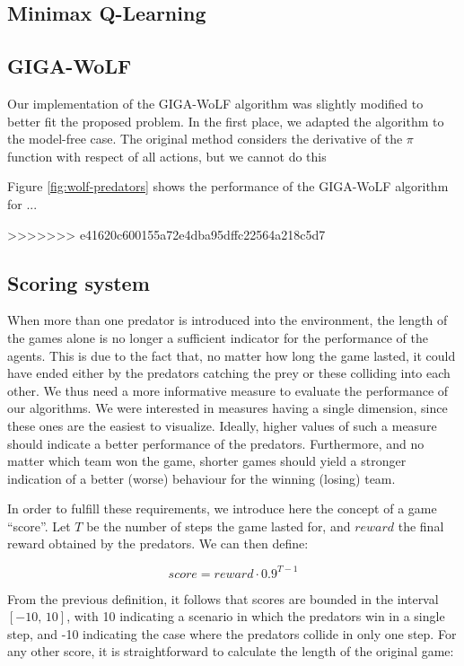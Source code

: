 \documentclass[a4paper,12pt]{article}
\begin{document}
\subsection{Minimax Q-Learning}

\subsection{GIGA-WoLF}

Our implementation of the GIGA-WoLF algorithm was slightly modified to better fit the proposed problem. In the first place, we adapted the algorithm to the model-free case. The original method considers the derivative of the $\pi$ function with respect of all actions, but we cannot do this 

Figure \ref{fig:wolf-predators} shows the performance of the GIGA-WoLF algorithm for ...

>>>>>>> e41620c600155a72e4dba95dffc22564a218c5d7
\subsection{Scoring system}

When more than one predator is introduced into the environment, the length of the games alone is no longer a sufficient indicator for the performance of the agents. This is due to the fact that, no matter how long the game lasted, it could have ended either by the predators catching the prey or these colliding into each other. We thus need a more informative measure to evaluate the performance of our algorithms. We were interested in measures having a single dimension, since these ones are the easiest to visualize. Ideally, higher values of such a measure should indicate a better performance of the predators. Furthermore, and no matter which team won the game, shorter games should yield a stronger indication of a better (worse) behaviour for the winning (losing) team.

In order to fulfill these requirements, we introduce here the concept of a game ``score''. Let $T$ be the number of steps the game lasted for, and $reward$ the final reward obtained by the predators. We can then define:

$$ score = reward \cdot 0.9^{T - 1} $$

From the previous definition, it follows that scores are bounded in the interval $[-10,\,10]$, with 10 indicating a scenario in which the predators win in a single step, and -10 indicating the case where the predators collide in only one step. For any other score, it is straightforward to calculate the length of the original game:
\end{document}
